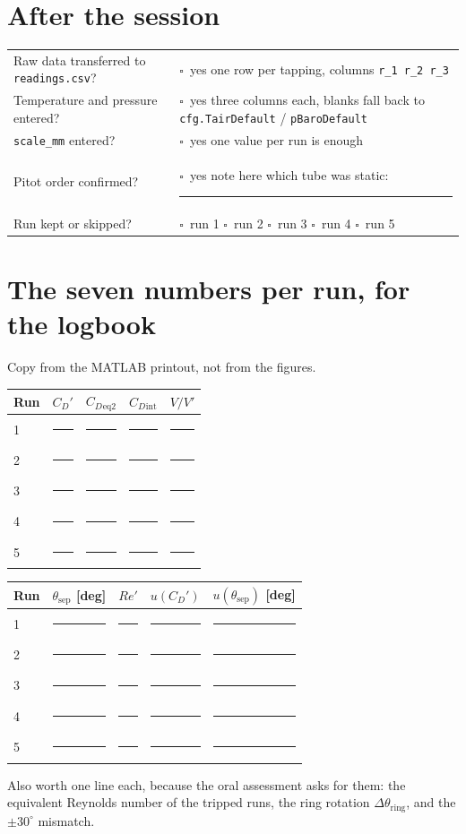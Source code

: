 \documentclass[10pt,a4paper]{article}
\newcommand{\blank}{\rule{1.55cm}{0.4pt}}
\newcommand{\nb}{\rule{1.9cm}{0.4pt}}
\newcommand{\checkbox}{\ensuremath{\square}}
\newcommand{\CD}{\ensuremath{C_D}}
\newcommand{\ReD}{\ensuremath{\mathit{Re}}}
\begin{document}
\section*{After the session}
\begin{tabularx}{\textwidth}{@{}lX@{}}
\toprule
Raw data transferred to \texttt{readings.csv}? & \checkbox\ yes \quad one row per tapping, columns \texttt{r\_1 r\_2 r\_3} \\
Temperature and pressure entered? & \checkbox\ yes \quad three columns each, blanks fall back to \texttt{cfg.TairDefault} / \texttt{pBaroDefault} \\
\texttt{scale\_mm} entered? & \checkbox\ yes \quad one value per run is enough \\
Pitot order confirmed? & \checkbox\ yes \quad note here which tube was static: \blank \\
Run kept or skipped? & \checkbox\ run 1 \quad \checkbox\ run 2 \quad \checkbox\ run 3 \quad \checkbox\ run 4 \quad \checkbox\ run 5 \\
\bottomrule
\end{tabularx}

\section*{The seven numbers per run, for the logbook}
Copy from the MATLAB printout, not from the figures.

\begin{tabularx}{0.95\textwidth}{@{}lXXXX@{}}
\toprule
Run & $\CD'$ & $\CD{}_{\text{eq2}}$ & $\CD{}_{\text{int}}$ & $V/V'$ \\
\midrule
1 & \nb & \nb & \nb & \nb \\
2 & \nb & \nb & \nb & \nb \\
3 & \nb & \nb & \nb & \nb \\
4 & \nb & \nb & \nb & \nb \\
5 & \nb & \nb & \nb & \nb \\
\bottomrule
\end{tabularx}

\vspace{2pt}

\begin{tabularx}{0.95\textwidth}{@{}lXXXX@{}}
\toprule
Run & $\theta_{\text{sep}}$ [deg] & $\ReD'$ & $u(\CD')$ & $u(\theta_{\text{sep}})$ [deg] \\
\midrule
1 & \nb & \nb & \nb & \nb \\
2 & \nb & \nb & \nb & \nb \\
3 & \nb & \nb & \nb & \nb \\
4 & \nb & \nb & \nb & \nb \\
5 & \nb & \nb & \nb & \nb \\
\bottomrule
\end{tabularx}

\vspace{4pt}
{\small Also worth one line each, because the oral assessment asks for them: the equivalent
Reynolds number of the tripped runs, the ring rotation $\Delta\theta_{\text{ring}}$, and the
$\pm30^\circ$ mismatch.}
\end{document}
